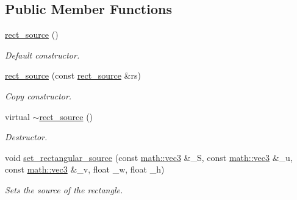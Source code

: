 \subsection*{Public Member Functions}
\begin{DoxyCompactItemize}
\item 
\mbox{\label{classphysim_1_1emitters_1_1free__emitters_1_1rect__source_aaeb94fe15698d716f7d3641f0d6365bf}} 
\hyperlink{classphysim_1_1emitters_1_1free__emitters_1_1rect__source_aaeb94fe15698d716f7d3641f0d6365bf}{rect\+\_\+source} ()
\begin{DoxyCompactList}\small\item\em Default constructor. \end{DoxyCompactList}\item 
\hyperlink{classphysim_1_1emitters_1_1free__emitters_1_1rect__source_a2aa2b82ecb8b46f6a5cda7c8b19f8f05}{rect\+\_\+source} (const \hyperlink{classphysim_1_1emitters_1_1free__emitters_1_1rect__source}{rect\+\_\+source} \&rs)
\begin{DoxyCompactList}\small\item\em Copy constructor. \end{DoxyCompactList}\item 
\mbox{\label{classphysim_1_1emitters_1_1free__emitters_1_1rect__source_aa3447fb2fe83b0b4c80ea30ef45882a2}} 
virtual \hyperlink{classphysim_1_1emitters_1_1free__emitters_1_1rect__source_aa3447fb2fe83b0b4c80ea30ef45882a2}{$\sim$rect\+\_\+source} ()
\begin{DoxyCompactList}\small\item\em Destructor. \end{DoxyCompactList}\item 
void \hyperlink{classphysim_1_1emitters_1_1free__emitters_1_1rect__source_ab85134622163dfc1e3a77730ea94557e}{set\+\_\+rectangular\+\_\+source} (const \hyperlink{structphysim_1_1math_1_1vec3}{math\+::vec3} \&\+\_\+S, const \hyperlink{structphysim_1_1math_1_1vec3}{math\+::vec3} \&\+\_\+u, const \hyperlink{structphysim_1_1math_1_1vec3}{math\+::vec3} \&\+\_\+v, float \+\_\+w, float \+\_\+h)
\begin{DoxyCompactList}\small\item\em Sets the source of the rectangle. \end{DoxyCompactList}\item 

\end{DoxyCompactItemize}
